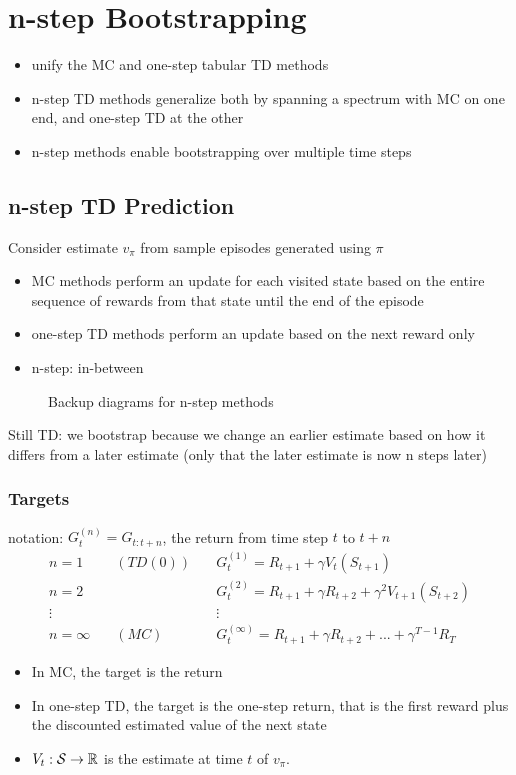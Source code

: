 \documentclass[sutton_barto_notes.tex]{subfiles}
\begin{document}
\newpage
\section{n-step Bootstrapping}

\begin{itemize}
\item unify the MC and one-step tabular TD methods
\item n-step TD methods generalize both by spanning a spectrum with MC on one end, and one-step TD at the other
\item n-step methods enable bootstrapping over multiple time steps
\end{itemize}

\subsection{n-step TD Prediction}

Consider estimate $v_\pi$ from sample episodes generated using $\pi$
\begin{itemize}
\item MC methods perform an update for each visited state based on the entire sequence of rewards from that state until the end of the episode
\item one-step TD methods perform an update based on the next reward only
\item n-step: in-between
\end{itemize}
\begin{figure}[h!]
    \centering
    \caption{ Backup diagrams for n-step methods }
\end{figure}
Still TD: we bootstrap because we change an earlier estimate based on how it differs from a later estimate (only that the later estimate is now n steps later)

\subsubsection{Targets}

notation: $G_t^{(n)} = G_{t:t+n}$, the return from time step $t$ to $t+n$
\begin{align}
n = 1 & \quad (TD(0)) \quad &  G_t^{(1)} = R_{t+1} + \gamma V_t(S_{t+1}) \label{eq:7.1}\tag{7.1}\\
n = 2 &  &  G_t^{(2)} = R_{t+1} + \gamma R_{t+2} + \gamma^2 V_{t+1}(S_{t+2})\tag{}\\
\vdots &  &  \vdots\tag{}\\
n = \infty & \quad (MC) \quad &  G_t^{(\infty)} = R_{t+1} + \gamma R_{t+2} + ... + \gamma^{T-1} R_T \label{eq:7.2}\tag{7.2}
\end{align}
\begin{itemize}
\item In MC, the target is the return
\item In one-step TD, the target is the one-step return, that is the first reward plus the discounted estimated value of the next state
\item $V_t: \operatorname*{\mathcal{S}} \rightarrow \operatorname*{\mathbb{R}}$ is the estimate at time $t$ of $v_\pi$.
\end{itemize}
\end{document}
